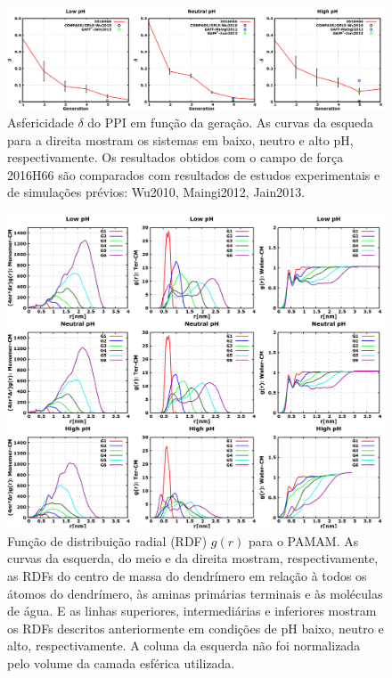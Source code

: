 \begin{figure}[ht!]
\centering
\includegraphics[width=\textwidth]{images/PME/PPIAsphericity.png}
\caption{Asfericidade $\delta$ do PPI em função da geração. As curvas da esqueda para a direita mostram os sistemas em baixo, neutro e alto pH, respectivamente.
Os resultados obtidos com o campo de força 2016H66\cite{Horta2016} são comparados com resultados de estudos experimentais e de simulações prévios:
Wu2010\cite{Wu2010}, %
Maingi2012\cite{Maingi2012}, %
Jain2013\cite{Jain2013}.} %
\label{supfig:PPIAsphericity}
\end{figure}

\begin{figure}[ht!]
\centering
\includegraphics[width=\textwidth]{images/PME/PPIRDF.png}
\caption{Função de distribuição radial (RDF) $g(r)$ para o PAMAM. As curvas da esquerda, do meio e da direita mostram, respectivamente, as RDFs do centro de massa do dendrímero em relação à todos os átomos do dendrímero, às aminas primárias terminais e às moléculas de água. E as linhas superiores, intermediárias e inferiores mostram os RDFs descritos anteriormente em condições de pH baixo, neutro e alto, respectivamente. A coluna da esquerda não foi normalizada pelo volume da camada esférica utilizada.}
\label{supfig:PPIRDF}
\end{figure}

